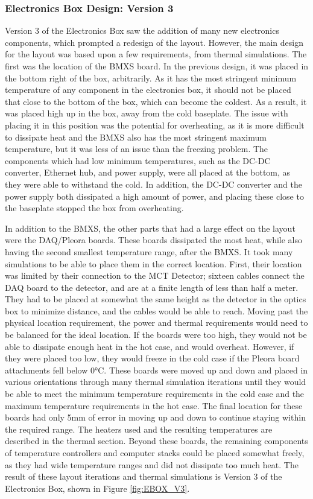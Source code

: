 \subsubsection{Electronics Box Design: Version 3}
Version 3 of the Electronics Box saw the addition of many new electronics components, which prompted a redesign of the layout. However, the main design for the layout was based upon a few requirements, from thermal simulations. The first was the location of the BMXS board. In the previous design, it was placed in the bottom right of the box, arbitrarily. As it has the most stringent minimum temperature of any component in the electronics box, it should not be placed that close to the bottom of the box, which can become the coldest. As a result, it was placed high up in the box, away from the cold baseplate. The issue with placing it in this position was the potential for overheating, as it is more difficult to dissipate heat and the BMXS also has the most stringent maximum temperature, but it was less of an issue than the freezing problem. The components which had low minimum temperatures, such as the DC-DC converter, Ethernet hub, and power supply, were all placed at the bottom, as they were able to withstand the cold. In addition, the DC-DC converter and the power supply both dissipated a high amount of power, and placing these close to the baseplate stopped the box from overheating. 

In addition to the BMXS, the other parts that had a large effect on the layout were the DAQ/Pleora boards. These boards dissipated the most heat, while also having the second smallest temperature range, after the BMXS. It took many simulations to be able to place them in the correct location. First, their location was limited by their connection to the MCT Detector; sixteen cables connect the DAQ board to the detector, and are at a finite length of less than half a meter. They had to be placed at somewhat the same height as the detector in the optics box to minimize distance, and the cables would be able to reach. Moving past the physical location requirement, the power and thermal requirements would need to be balanced for the ideal location. If the boards were too high, they would not be able to dissipate enough heat in the hot case, and would overheat. However, if they were placed too low, they would freeze in the cold case if the Pleora board attachments fell below 0°C. These boards were moved up and down and placed in various orientations through many thermal simulation iterations until they would be able to meet the minimum temperature requirements in the cold case and the maximum temperature requirements in the hot case. The final location for these boards had only 5mm of error in moving up and down to continue staying within the required range. The heaters used and the resulting temperatures are described in the thermal section. Beyond these boards, the remaining components of temperature controllers and computer stacks could be placed somewhat freely, as they had wide temperature ranges and did not dissipate too much heat. The result of these layout iterations and thermal simulations is Version 3 of the Electronics Box, shown in Figure \ref{fig:EBOX_V3}.

